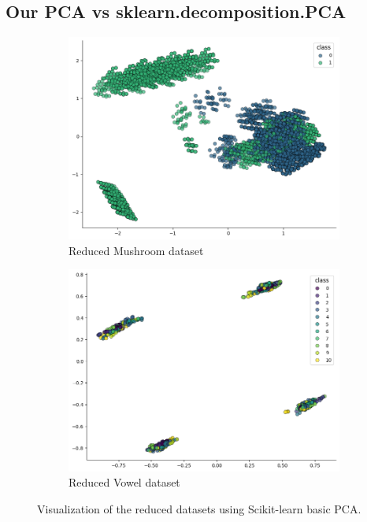 \subsection{Our PCA vs sklearn.decomposition.PCA}
\label{subsec:pca-vs-scikit-pca}



\begin{figure}[h!]
    \centering
    \begin{subfigure}[b]{0.45\textwidth}
        \centering
        \includegraphics[width=\textwidth]{figures/mushroom_sklearn_pca.png}
        \caption{Reduced Mushroom dataset}
        \label{subfig:mushroom_sklearn_pca}
    \end{subfigure}
    \hfill
    \begin{subfigure}[b]{0.45\textwidth}
        \centering
        \includegraphics[width=\textwidth]{figures/vowel_sklearn_pca.png}
        \caption{Reduced Vowel dataset}
        \label{subfig:vowel_sklearn_pca}
    \end{subfigure}
    
    \caption{Visualization of the reduced datasets using Scikit-learn basic PCA.}
    \label{fig:sklearn_pca_datasets}
\end{figure}

